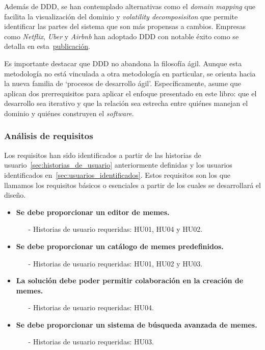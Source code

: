 Además de DDD, se han contemplado alternativas como el \textit{domain mapping} que facilita la visualización del dominio y \textit{volatility decomposisiton} que permite identificar las partes del sistema que son más propensas a cambios. Empresas como \textit{Netflix}, \textit{Uber} y \textit{Airbnb} han adoptado DDD con notable éxito como se detalla en esta~\href{https://blog.bitsrc.io demystifying-domain-driven-design-ddd-in-modern-software-architecture-b57e27c210f7}{publicación}.

Es importante destacar que DDD no abandona la filosofía ágil. Aunque esta metodología no está vinculada a otra metodología en particular, se orienta hacia la nueva familia de `procesos de desarrollo ágil'. Específicamente, asume que aplican dos prerrequisitos para aplicar el enfoque presentado en este libro: que el desarrollo sea iterativo y que la relación sea estrecha entre quiénes manejan el dominio y quiénes construyen el \textit{software}.

\subsubsection{Análisis de requisitos}

Los requisitos han sido identificados a partir de las historias de usuario~\ref{sec:historias_de_usuario} anteriormente definidas y los usuarios identificados en~\ref{sec:usuarios_identificados}. Estos requisitos son los que llamamos los requisitos básicos o esenciales a partir de los cuales se desarrollará el diseño.

\begin{itemize}
    \item \textbf{Se debe proporcionar un editor de memes.}
          \begin{itemize}
              \item[-] Historias de usuario requeridas: HU01, HU04 y HU02.
          \end{itemize}
    \item \textbf{Se debe proporcionar un catálogo de memes predefinidos.}
          \begin{itemize}
              \item[-] Historias de usuario requeridas: HU01, HU02 y HU03.
          \end{itemize}
    \item \textbf{La solución debe poder permitir colaboración en la creación de memes.}
          \begin{itemize}
              \item[-] Historias de usuario requeridas: HU04.
          \end{itemize}
    \item \textbf{Se debe proporcionar un sistema de búsqueda avanzada de memes.}
          \begin{itemize}
              \item[-] Historias de usuario requeridas: HU03.
          \end{itemize}
\end{itemize}

